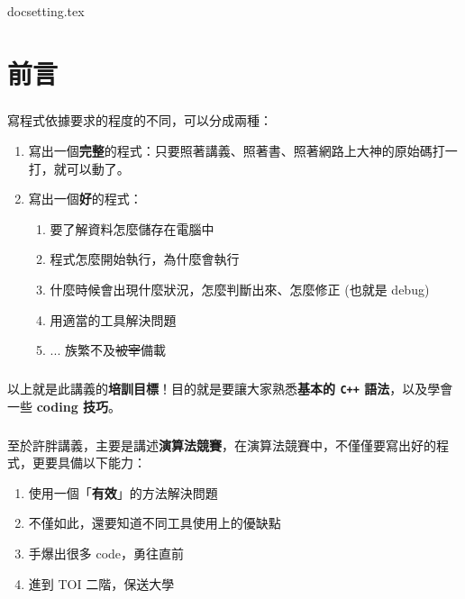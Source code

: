 \documentclass[12pt,a4paper,oneside]{report}
\begin{document}
\begin{CJK}{UTF8}{bkai}

{docsetting.tex}
\setcounter{chapter}{0}

\fi

\chapter*{前言}

\paragraph{}寫程式依據要求的程度的不同，可以分成兩種：
\begin{enumerate}
\item 寫出一個\textbf{完整}的程式：只要照著講義、照著書、照著網路上大神的原始碼打一打，就可以動了。
\item 寫出一個\textbf{好}的程式：
  \begin{enumerate}
    \item 要了解資料怎麼儲存在電腦中
    \item 程式怎麼開始執行，為什麼會執行
    \item 什麼時候會出現什麼狀況，怎麼判斷出來、怎麼修正 (也就是 debug)
    \item 用適當的工具解決問題
    \item ... 族繁不及\sout{被宰}備載
  \end{enumerate}
\end{enumerate}

\paragraph{}以上就是此講義的\textbf{培訓目標}！目的就是要讓大家熟悉\textbf{基本的 \texttt{C++} 語法}，以及學會一些 \textbf{coding 技巧}。

\paragraph{}至於許胖講義，主要是講述\textbf{演算法競賽}，在演算法競賽中，不僅僅要寫出好的程式，更要具備以下能力：
\begin{enumerate}
\item 使用一個「\textbf{有效}」的方法解決問題
\item 不僅如此，還要知道不同工具使用上的優缺點
\item 手爆出很多 code，勇往直前
\item 進到 TOI 二階，保送大學
\end{enumerate}


\end{CJK}
\end{document}
